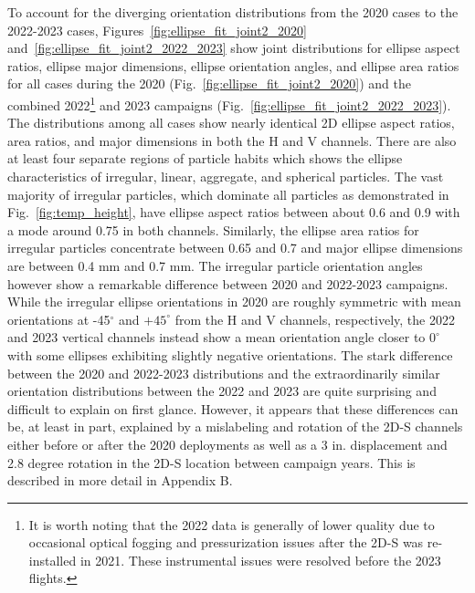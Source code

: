\documentclass[amt, manuscript]{copernicus}
\begin{document}

To account for the diverging orientation distributions from the 2020 cases to the 2022-2023 cases, Figures~\ref{fig:ellipse_fit_joint2_2020} and~\ref{fig:ellipse_fit_joint2_2022_2023} show joint distributions for ellipse aspect ratios, ellipse major dimensions, ellipse orientation angles, and ellipse area ratios for all cases during the 2020 (Fig.~\ref{fig:ellipse_fit_joint2_2020}) and the combined 2022\footnote{It is worth noting that the 2022 data is generally of lower quality due to occasional optical fogging and pressurization issues after the 2D-S was re-installed in 2021. These instrumental issues were resolved before the 2023 flights.} and 2023 campaigns (Fig.~\ref{fig:ellipse_fit_joint2_2022_2023}). The distributions among all cases show nearly identical 2D ellipse aspect ratios, area ratios, and major dimensions in both the H and V channels. There are also at least four separate regions of particle habits which shows the ellipse characteristics of irregular, linear, aggregate, and spherical particles. The vast majority of irregular particles, which dominate all particles as demonstrated in Fig.~\ref{fig:temp_height}, have ellipse aspect ratios between about 0.6 and 0.9 with a mode around 0.75 in both channels. Similarly, the ellipse area ratios for irregular particles concentrate between 0.65 and 0.7 and major ellipse dimensions are between 0.4 mm and 0.7 mm. The irregular particle orientation angles however show a remarkable difference between 2020 and 2022-2023 campaigns. While the irregular ellipse orientations in 2020 are roughly symmetric with mean orientations at -45$^{\circ}$ and $+45^{\circ}$ from the H and V channels, respectively, the 2022 and 2023 vertical channels instead show a mean orientation angle closer to $0^{\circ}$ with some ellipses exhibiting slightly negative orientations. The stark difference between the 2020 and 2022-2023 distributions and the extraordinarily similar orientation distributions between the 2022 and 2023 are quite surprising and difficult to explain on first glance. However, it appears that these differences can be, at least in part, explained by a mislabeling and rotation of the 2D-S channels either before or after the 2020 deployments as well as a 3 in. displacement and 2.8 degree rotation in the 2D-S location between campaign years. This is described in more detail in Appendix B.
\end{document}
